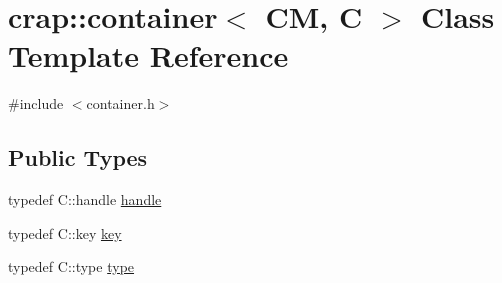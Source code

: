 \hypertarget{classcrap_1_1container}{\section{crap\+:\+:container$<$ C\+M, C $>$ Class Template Reference}
\label{classcrap_1_1container}
}


{\ttfamily \#include $<$container.\+h$>$}

\subsection*{Public Types}
\begin{DoxyCompactItemize}
\item 
typedef C\+::handle \hyperlink{classcrap_1_1container_acc6e787516e0ca6f07b767a782a582a4}{handle}
\item 
typedef C\+::key \hyperlink{classcrap_1_1container_ab8883be30faed0c7e4ac1128376a3d74}{key}
\item 
typedef C\+::type \hyperlink{classcrap_1_1container_aa6e3b5a49852a0d3efc042014345d3f1}{type}
\end{DoxyCompactItemize}
